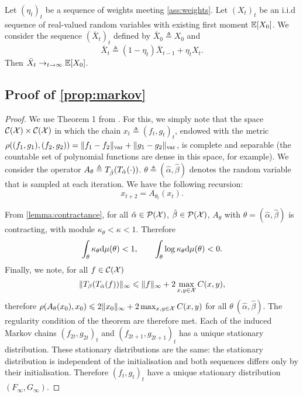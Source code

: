 \begin{lemma}\label{lemma:running}
    Let $(\eta_t)_t$ be a sequence of weights meeting \autoref{ass:weights}. Let
    $(X_t)_t$ be an i.i.d sequence of real-valued random variables with existing
    first moment $\mathbb{E}[X_0]$. We consider the sequence ${(\bar X_t)}_t$ defined
    by $\bar X_0 \triangleq X_0$ and 
    \begin{equation}
        \bar X_t \triangleq (1 - \eta_t) \bar X_{t-1} + \eta_t X_t.
    \end{equation}
    Then $\bar X_t \to_{t \to \infty} \mathbb{E}[X_0]$.
\end{lemma}

\subsection{Proof of \autoref{prop:markov}}\label{sec:proof_markov}

\begin{proof}
    We use Theorem 1 from \citet{diaconis_iterated}. For this, we simply note
    that the space $\mathcal{C}(\mathcal{X}) \times \mathcal{C}(\mathcal{X})$ in which the chain ${x_t
    \triangleq (f_t, g_t)}_t$, endowed with the metric $\rho((f_1, g_1), (f_2,
    g_2)) = \Vert f_1 - f_2 \Vert_{\text{\upshape var}} + \Vert g_1 - g_2 \Vert_{\text{\upshape var}}$, is
    complete and separable (the countable set of polynomial functions are dense in this space, for example).
    We consider the operator $A_{\theta} \triangleq T_{\hat \beta}(T_{\hat
    \alpha}(\cdot))$. $\theta \triangleq (\hat \alpha, \hat \beta)$ denotes
    the random variable that is sampled at each iteration. We have the following
    recursion:
    \begin{equation}
        x_{t+2} = A_{\theta_t}(x_t).
    \end{equation}
    
    From \autoref{lemma:contractance}, for all $\hat \alpha \in \mathcal{P}(\mathcal{X})$, $\hat \beta \in \mathcal{P}(\mathcal{X})$, $A_{\theta}$
    with $\theta = (\hat \alpha, \hat \beta)$ is contracting, with module
    $\kappa_\theta < \kappa < 1$. Therefore
    \begin{equation}
        \int_{\theta} \kappa_\theta \textrm{d} \mu(\theta) < 1, \qquad \int_{\theta}
         \log \kappa_\theta \textrm{d} \mu(\theta) < 0.
    \end{equation}
    Finally, we note, for all $f \in \mathcal{C}(\mathcal{X})$
    \begin{equation}
        \Vert T_{\beta}(T_{\hat \alpha}(f)) \Vert_{\infty} 
        \leqslant \Vert f \Vert_\infty + 2 \max_{x,y \in \mathcal{X}} C(x, y),
    \end{equation}
    therefore $\rho(A_\theta(x_0), x_0) \leqslant 2 \Vert x_0 \Vert_\infty + 2
    \max_{x,y \in \mathcal{X}} C(x, y)$ for all $\theta \ (\hat \alpha, \hat \beta)$.
    The regularity condition of the theorem are therefore met. Each of the
    induced Markov chains ${(f_{2t}, g_{2t})}_t$ and ${(f_{2t + 1}, g_{2t +
    1})}_t$ has a unique stationary distribution. These stationary distributions
    are the same: the stationary distribution is independent of the
    initialisation and both sequences differs only by their initialisation.
    Therefore ${(f_{t}, g_{t})}_t$ have a unique stationary distribution
    $(F_\infty, G_\infty)$.
\end{proof}

